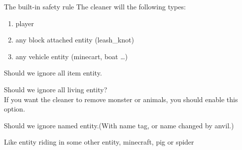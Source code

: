 \begin{samepage}
    \begin{note}{The built-in safety rule}
        The cleaner will  the following types:
        \begin{enumerate}
            \item player
            \item any block attached entity (\eg leash\_knot)
            \item any vehicle entity (\eg minecart, boat \ldots)
        \end{enumerate}
    \end{note}
\end{samepage}

Should we ignore all item entity.

Should we ignore all living entity?\\
If you want the cleaner to remove monster or animals, you should enable this option.

Should we ignore named entity.(With name tag, or name changed by anvil.)

Like entity riding in some other entity, \eg minecraft, pig or spider



